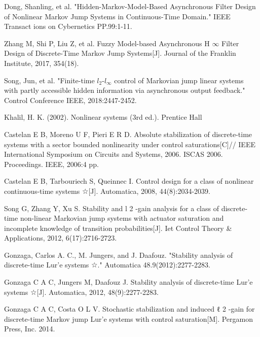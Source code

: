 \documentclass[conference]{IEEEtran}
\begin{document}
\begin{thebibliography}{1}
	Dong, Shanling, et al. "Hidden-Markov-Model-Based Asynchronous Filter Design of Nonlinear Markov Jump Systems in Continuous-Time Domain." IEEE Transact  ions on Cybernetics PP.99:1-11.
	
	Zhang M, Shi P, Liu Z, et al. Fuzzy Model-based Asynchronous H $\infty$ Filter Design of Discrete-Time Markov Jump Systems[J]. Journal of the Franklin Institute, 2017, 354(18).
	
	Song, Jun, et al. "Finite-time $l_2$-$l_\infty$ control of Markovian jump linear systems with partly accessible hidden information via asynchronous output feedback." Control Conference IEEE, 2018:2447-2452.
	
	Khalil, H. K. (2002). Nonlinear systems (3rd ed.). Prentice Hall
	
	Castelan E B, Moreno U F, Pieri E R D. Absolute stabilization of discrete-time systems with a sector bounded nonlinearity under control saturations[C]// IEEE International Symposium on Circuits and Systems, 2006. ISCAS 2006. Proceedings. IEEE, 2006:4 pp.
	
	Castelan E B, Tarbouriech S, Queinnec I. Control design for a class of nonlinear continuous-time systems ☆[J]. Automatica, 2008, 44(8):2034-2039.
	
	Song G, Zhang Y, Xu S. Stability and l 2 -gain analysis for a class of discrete-time non-linear Markovian jump systems with actuator saturation and incomplete knowledge of transition probabilities[J]. Iet Control Theory \& Applications, 2012, 6(17):2716-2723.
	
	Gonzaga, Carlos A. C., M. Jungers, and J. Daafouz. "Stability analysis of discrete-time Lur’e systems ☆." Automatica 48.9(2012):2277-2283.
	
	Gonzaga C A C, Jungers M, Daafouz J. Stability analysis of discrete-time Lur’e systems ☆[J]. Automatica, 2012, 48(9):2277-2283.
	
	Gonzaga C A C, Costa O L V. Stochastic stabilization and induced ℓ 2 -gain for discrete-time Markov jump Lur'e systems with control saturation[M]. Pergamon Press, Inc. 2014.
	
\end{thebibliography}




\end{document}
